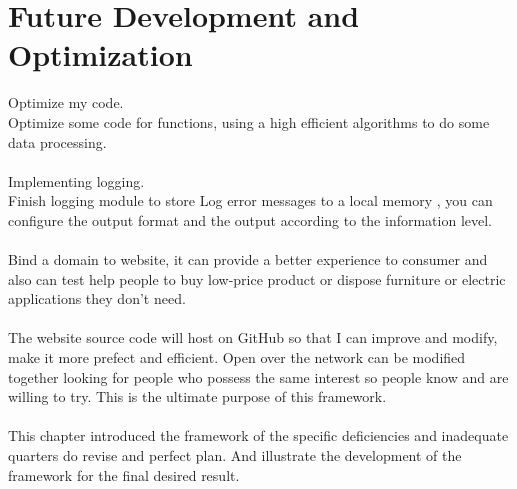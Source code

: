 \section{Future Development and Optimization}
Optimize my code.\\
Optimize some code for functions, using a high efficient algorithms to do some data processing.\\
\\
Implementing logging.\\
Finish logging module to store Log error messages to a local memory , you can configure the output format and the output according to the information level.\\
\\
Bind a domain to website, it can provide a better experience to consumer and also can test help people to buy low-price product or dispose furniture or electric applications they don't need.\\
\\ 
The website source code will host on GitHub so that I can improve and modify, make it more prefect and efficient. Open over the network can be modified together looking for people who possess the same interest so people know and are willing to try. This is the ultimate purpose of this framework.\\
\\
This chapter introduced the framework of the specific deficiencies and inadequate quarters do revise and perfect plan. And illustrate the development of the framework for the final desired result.
